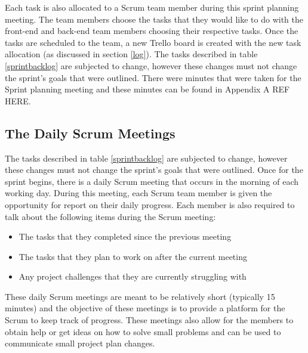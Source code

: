 \documentclass[12pt,onecolumn]{article}
\begin{document}
	Each task is also allocated to a Scrum team member during this sprint planning meeting. The team members choose the tasks that they would like to do with the front-end and back-end team members choosing their respective tasks. Once the tasks are scheduled to the team, a new Trello board is created with the new task allocation (as discussed in section \ref{log}). The tasks described in table \ref{sprintbacklog} are subjected to change, however these changes must not change the sprint's goals that were outlined. There were minutes that were taken for the Sprint planning meeting and these minutes can be found in Appendix A REF HERE.   
	
	\subsection{The Daily Scrum Meetings}
	
	The tasks described in table \ref{sprintbacklog} are subjected to change, however these changes must not change the sprint's goals that were outlined. Once for the sprint begins, there is a daily Scrum meeting that occurs in the morning of each working day. During this meeting, each Scrum team member is given the opportunity for report on their daily progress. Each member is also required to talk about the following items during the Scrum meeting:
	
	\begin{itemize}
		\item The tasks that they completed since the previous meeting
		\item The tasks that they plan to work on after the current meeting
		\item Any project challenges that they are currently struggling with 
	\end{itemize}
	
	These daily Scrum meetings are meant to be relatively short (typically 15 minutes) and the objective of these meetings is to provide a platform for the Scrum to keep track of progress. These meetings also allow for the members to obtain help or get ideas on how to solve small problems and can be used to communicate small project plan changes. 
	
\end{document}
